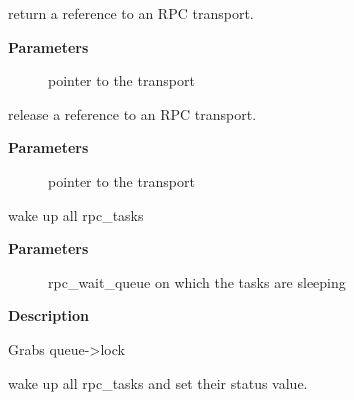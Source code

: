 \documentclass[a4paper,8pt,english]{sphinxmanual}
\begin{document}
\begin{fulllineitems}
\label{networking/kapi:c.xprt_get}
return a reference to an RPC transport.

\end{fulllineitems}


\textbf{Parameters}
\begin{description}
\item[{}] \leavevmode
pointer to the transport

\end{description}

\begin{fulllineitems}
\label{networking/kapi:c.xprt_put}
release a reference to an RPC transport.

\end{fulllineitems}


\textbf{Parameters}
\begin{description}
\item[{}] \leavevmode
pointer to the transport

\end{description}

\begin{fulllineitems}
\label{networking/kapi:c.rpc_wake_up}
wake up all rpc\_tasks

\end{fulllineitems}


\textbf{Parameters}
\begin{description}
\item[{}] \leavevmode
rpc\_wait\_queue on which the tasks are sleeping

\end{description}

\textbf{Description}

Grabs queue-\textgreater{}lock

\begin{fulllineitems}
\label{networking/kapi:c.rpc_wake_up_status}
wake up all rpc\_tasks and set their status value.

\end{fulllineitems}
\end{document}
